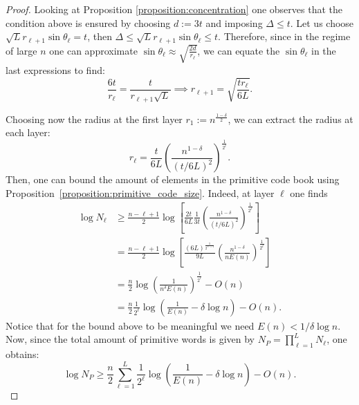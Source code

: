 \documentclass[10pt, conference]{IEEEtran}
\newcommand{\1}{\mathds{1}}
\begin{document}
\begin{proof}
Looking at Proposition \ref{proposition:concentration} one observes that the condition above is ensured by choosing $d:=3t$ and imposing $\Delta\leq t$. Let us choose $\sqrt{L}r_{\ell+1}\sin\theta_\ell=t$, then $\Delta\leq\sqrt{L}r_{\ell+1}\sin\theta_\ell\leq t$. Therefore, since in the regime of large $n$ one can approximate $\sin\theta_\ell\approx\sqrt{\frac{2d}{r_\ell}}$, we can equate the $\sin\theta_\ell$ in the last expressions to find:
\begin{equation}
\frac{6t}{r_\ell}=\frac{t}{r_{\ell+1}\sqrt{L}}\implies r_{\ell+1}=\sqrt{\frac{tr_\ell}{6L}}.
\end{equation}

Choosing now the radius at the first layer $r_1:=n^{\frac{1-\delta}{2}}$, we can extract the radius at each layer:
\begin{equation}\label{eq:RR_radius_layer}
    r_\ell=\frac{t}{6L}\left(\frac{n^{1-\delta}}{(t/6L)^2}\right)^{\frac{1}{2^\ell}}.
\end{equation}
Then, one can bound the amount of elements in the primitive code book using Proposition~\ref{proposition:primitive_code_size}. Indeed, at layer $\ell$ one finds
\begin{align}
\log N_\ell&\geq\frac{n-\ell+1}{2}\log\left[\frac{2t}{6L}\frac{1}{3t}\left(\frac{n^{1-\delta}}{(t/6L)^2}\right)^\frac{1}{2^\ell}\right]\nonumber\\
&=\frac{n-\ell+1}{2}\log\left[\frac{(6L)^{\frac{1}{2^{\ell-1}}}}{9L}\left(\frac{n^{1-\delta}}{nE(n)}\right)^\frac{1}{2^\ell}\right]\nonumber\\
&=\frac{n}{2}\log\left(\frac{1}{n^\delta E(n)}\right)^\frac{1}{2^\ell}-O(n)\nonumber\\
&=\frac{n}{2}\frac{1}{2^\ell}\log\left(\frac{1}{E(n)}-\delta\log n\right)-O(n)\label{RR_layer_size}.
\end{align}
Notice that for the bound above to be meaningful we need $E(n)<1/\delta\log n$.
Now, since the total amount of primitive words is given by $N_P=\prod_{\ell=1}^LN_\ell$, one obtains:
\begin{equation}\label{RR_primitive_size}
\log N_P\geq\frac{n}{2}\sum_{\ell=1}^L\frac{1}{2^\ell}\log\left(\frac{1}{E(n)}-\delta\log n\right)-O(n).
\end{equation}


\end{proof}
\end{document}
